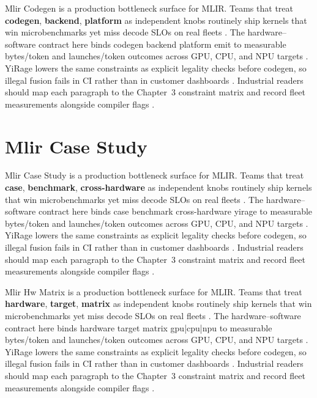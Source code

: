 Mlir Codegen is a production bottleneck surface for MLIR. Teams that treat \textbf{codegen}, \textbf{backend}, \textbf{platform} as independent knobs routinely ship kernels that win microbenchmarks yet miss decode SLOs on real fleets \citep{nvidia2022hopper,amd2024aie}. The hardware--software contract here binds codegen backend platform emit to measurable bytes/token and launches/token outcomes across GPU, CPU, and NPU targets \citep{semianalysis2024tma,dlbook}. YiRage lowers the same constraints as explicit legality checks before codegen, so illegal fusion fails in CI rather than in customer dashboards \citep{amd2024xdna,dao2022flashattention}. Industrial readers should map each paragraph to the Chapter~3 constraint matrix and record fleet measurements alongside compiler flags \citep{amd2024aie,kwon2023vllm}.

\section{Mlir Case Study}
\label{sec:mlir_case_study}

Mlir Case Study is a production bottleneck surface for MLIR. Teams that treat \textbf{case}, \textbf{benchmark}, \textbf{cross-hardware} as independent knobs routinely ship kernels that win microbenchmarks yet miss decode SLOs on real fleets \citep{semianalysis2024tma,dlbook}. The hardware--software contract here binds case benchmark cross-hardware yirage to measurable bytes/token and launches/token outcomes across GPU, CPU, and NPU targets \citep{amd2024xdna,dao2022flashattention}. YiRage lowers the same constraints as explicit legality checks before codegen, so illegal fusion fails in CI rather than in customer dashboards \citep{amd2024aie,kwon2023vllm}. Industrial readers should map each paragraph to the Chapter~3 constraint matrix and record fleet measurements alongside compiler flags \citep{dlbook,nvidia2024cudagraphs}.

Mlir Hw Matrix is a production bottleneck surface for MLIR. Teams that treat \textbf{hardware}, \textbf{target}, \textbf{matrix} as independent knobs routinely ship kernels that win microbenchmarks yet miss decode SLOs on real fleets \citep{memoryfloor2026,amd2024xdna}. The hardware--software contract here binds hardware target matrix gpu|cpu|npu to measurable bytes/token and launches/token outcomes across GPU, CPU, and NPU targets \citep{nvidia2022hopper,amd2024aie}. YiRage lowers the same constraints as explicit legality checks before codegen, so illegal fusion fails in CI rather than in customer dashboards \citep{semianalysis2024tma,dlbook}. Industrial readers should map each paragraph to the Chapter~3 constraint matrix and record fleet measurements alongside compiler flags \citep{amd2024xdna,dao2022flashattention}.

